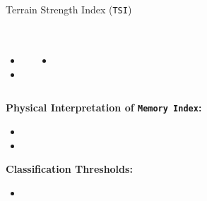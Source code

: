 \documentclass[8pt, aspectratio=169]{beamer}
\begin{document}
\begin{frame}{Terrain Strength Index (\texttt{TSI})}
    \vspace{-0.5cm}
    \footnotesize
    \begin{center}
        \begin{table}
            \centering
            \caption{}
            \begin{tabular}{lccccc}
                \toprule
                \midrule
                \bottomrule
            \end{tabular}
        \end{table}
    \end{center}

    \vspace{0.1cm}
    \begin{columns}[T]
        \begin{block}{}
            \footnotesize
            \begin{itemize}
                \item
                \item
            \end{itemize}
        \end{block}

        \begin{block}{}
            \footnotesize
            \begin{itemize}
                \item
            \end{itemize}
        \end{block}
    \end{columns}

    \vspace{0.2cm}
    \footnotesize
    \textbf{Physical Interpretation of \texttt{Memory Index}:}
    \begin{itemize}
        \item
        \item
    \end{itemize}

    \vspace{0.2cm}
    \footnotesize
    \textbf{Classification Thresholds:}
    \begin{itemize}
        \item
    \end{itemize}
\end{frame}
\end{document}
